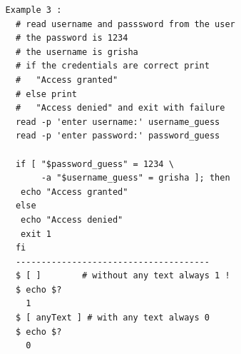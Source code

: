 \documentclass[a4paper,12pt]{article}
\begin{document}
\begin{verbatim}
          Example 3 : 
            # read username and passsword from the user
            # the password is 1234
            # the username is grisha
            # if the credentials are correct print
            # 	"Access granted"
            # else print
            # 	"Access denied" and exit with failure
            read -p 'enter username:' username_guess
            read -p 'enter password:' password_guess

            if [ "$password_guess" = 1234 \
                 -a "$username_guess" = grisha ]; then 
	         echo "Access granted"
            else 
	         echo "Access denied"
	         exit 1
            fi  
            --------------------------------------
            $ [ ]        # without any text always 1 !
            $ echo $?
              1
            $ [ anyText ] # with any text always 0
            $ echo $?
              0

\end{verbatim}
\end{document}
